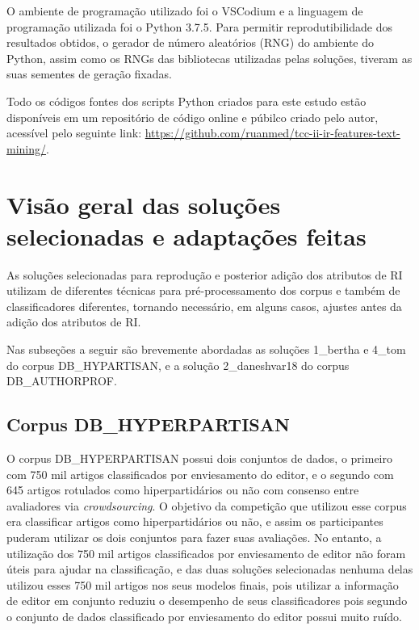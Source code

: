 		O ambiente de programação utilizado foi o VSCodium e a linguagem de programação utilizada foi o Python 3.7.5.
		Para permitir reprodutibilidade dos resultados obtidos, o gerador de número aleatórios (RNG) do ambiente do Python, assim como os RNGs das bibliotecas utilizadas pelas soluções, tiveram as suas sementes de geração fixadas.

		Todo os códigos fontes dos scripts Python criados para este estudo estão disponíveis em um repositório de código online e púbilco criado pelo autor, acessível pelo seguinte link: \hyperlink{https://github.com/ruanmed/tcc-ii-ir-features-text-mining/}{https://github.com/ruanmed/tcc-ii-ir-features-text-mining/}.

	\section{Visão geral das soluções selecionadas e adaptações feitas} \label{sec:VisãoSoluçõesEAdaptações}
		As soluções selecionadas para reprodução e posterior adição dos atributos de RI utilizam de diferentes técnicas para pré-processamento dos corpus e também de classificadores diferentes, tornando necessário, em alguns casos, ajustes antes da adição dos atributos de RI.

		Nas subseções a seguir são brevemente abordadas as soluções 1\_bertha e 4\_tom do corpus DB\_HYPARTISAN, e a solução 2\_daneshvar18 do corpus DB\_AUTHORPROF.

		\subsection{Corpus DB\_HYPERPARTISAN}
			O corpus DB\_HYPERPARTISAN possui dois conjuntos de dados, o primeiro com 750 mil artigos classificados por enviesamento do editor, e o segundo com 645 artigos rotulados como hiperpartidários ou não com consenso entre avaliadores via \textit{crowdsourcing}.
			O objetivo da competição que utilizou esse corpus era classificar artigos como hiperpartidários ou não, e assim os participantes puderam utilizar os dois conjuntos para fazer suas avaliações. 
			No entanto, a utilização dos 750 mil artigos classificados por enviesamento de editor não foram úteis para ajudar na classificação, e das duas soluções selecionadas nenhuma delas utilizou esses 750 mil artigos nos seus modelos finais, pois utilizar a informação de editor em conjunto reduziu o desempenho de seus classificadores \cite[p.~840]{jiang-etal-2019-team} pois segundo  o conjunto de dados classificado por enviesamento do editor possui muito ruído.

